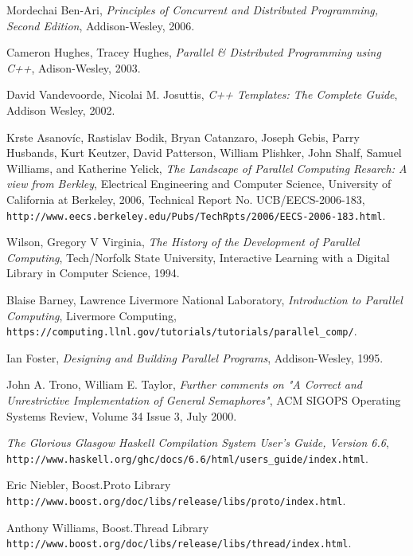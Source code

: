 
\begin{thebibliography}{99}

 Mordechai Ben-Ari, \textit{Principles of Concurrent and Distributed Programming,
  Second Edition}, Addison-Wesley, 2006.

 Cameron Hughes, Tracey Hughes, \textit{Parallel \& Distributed Programming using C++},
  Adison-Wesley, 2003.

 David Vandevoorde, Nicolai M. Josuttis, \textit{C++ Templates: The Complete Guide},
  Addison Wesley, 2002.

 Krste Asanovíc, Rastislav Bodik, Bryan Catanzaro, Joseph Gebis,
  Parry Husbands, Kurt Keutzer, David Patterson,
  William Plishker, John Shalf, Samuel Williams, and Katherine Yelick,
  \textit{The Landscape of Parallel Computing Resarch: A view from Berkley},
  Electrical Engineering and Computer Science, University of California at Berkeley, 2006,
  Technical Report No. UCB/EECS-2006-183,
  \texttt{http://www.eecs.berkeley.edu/Pubs/TechRpts/2006/EECS-2006-183.html}.

 Wilson, Gregory V Virginia, \textit{The History of the Development of Parallel Computing}, Tech/Norfolk State University, Interactive Learning with a Digital Library in Computer Science, 1994.

 Blaise Barney, Lawrence Livermore National Laboratory, \textit{Introduction to Parallel Computing}, Livermore Computing, \texttt{https://computing.llnl.gov/tutorials/tutorials/parallel\_comp/}.

 Ian Foster, \textit{Designing and Building Parallel Programs}, Addison-Wesley, 1995.

 John A. Trono,	William E. Taylor, \textit{Further comments on "A Correct and Unrestrictive Implementation of General Semaphores"}, ACM SIGOPS Operating Systems Review, Volume 34 Issue 3, July 2000.

 \textit{The Glorious Glasgow Haskell Compilation System User's Guide, Version 6.6}, \texttt{http://www.haskell.org/ghc/docs/6.6/html/users\_guide/index.html}.

 Eric Niebler, Boost.Proto Library \texttt{http://www.boost.org/doc/libs/release/libs/proto/index.html}.

 Anthony Williams, Boost.Thread Library \texttt{http://www.boost.org/doc/libs/release/libs/thread/index.html}.


\end{thebibliography}
